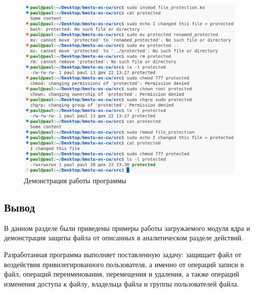 \begin{figure}[h]
	\centering
	\captionsetup{justification=centering}
	\includegraphics[width=152mm]{img/example.png}
	\caption{Демонстрация  работы  программы}
	\label{fig:example}
\end{figure}

\subsection*{Вывод}
В данном разделе были приведены примеры работы загружаемого модуля ядра и демонстрация защиты файла от описанных в аналитическом разделе действий.

Разработанная программа выполняет поставленную задачу: защищает файл от воздействия привилегированного пользователя, а именно от операций записи в файл, операций переименования, перемещения и удаления, а также операций изменения доступа к файлу, владельца файла и группы пользователей файла.




